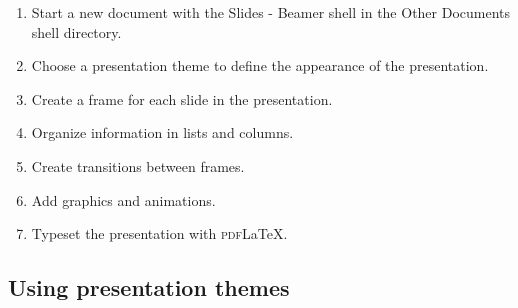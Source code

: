 \documentclass[notes=show,beamer]{beamer}
\begin{document}
\begin{frame}%


\begin{enumerate}
\item Start a new document with the Slides - Beamer shell in the Other
Documents shell directory.

\item Choose a presentation theme to define the appearance of the
presentation.

\item Create a frame for each slide in the presentation.

\item Organize information in lists and columns.

\item Create transitions between frames.

\item Add graphics and animations.

\item Typeset the presentation with \textsc{pdf}\LaTeX{}.
\end{enumerate}

\transboxout%
\end{frame}%

\subsection{Using presentation themes}
\end{document}
